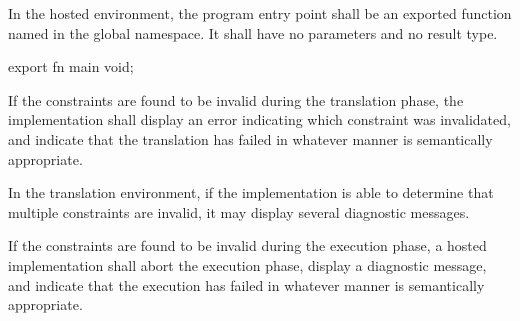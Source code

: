 
\specsubsubitem
In the hosted environment, the program entry point shall be an exported
function named  in the global namespace. It shall have no parameters
and no result type.


\begin{codesample}
export fn main void;
\end{codesample}



\specsubitem
If the constraints are found to be invalid during the translation phase, the
implementation shall display an error indicating which constraint was
invalidated, and indicate that the translation has failed in whatever manner is
semantically appropriate.


\specsubitem
In the translation environment, if the implementation is able to determine that
multiple constraints are invalid, it may display several diagnostic messages.

\specsubitem
If the constraints are found to be invalid during the execution phase, a hosted
implementation shall abort the execution phase, display a diagnostic message,
and indicate that the execution has failed in whatever manner is semantically
appropriate.
